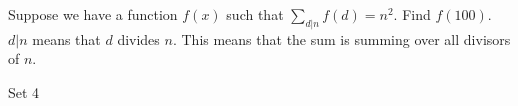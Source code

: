 Suppose we have a function $f(x)$ such that $\sum_{d|n} f(d) = n^2$. Find $f(100)$. $d|n$ means that $d$ divides $n$. This means that the sum is summing over all divisors of $n$.





Set 4
